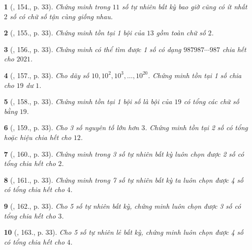 \documentclass{article}
\newtheorem{baitoan}{}
\begin{document}
\begin{baitoan}[\cite{Tuyen_Toan_6}, 154., p. 33]
	Chứng minh trong $11$ số tự nhiên bất kỳ bao giờ cũng có ít nhất $2$ số có chữ số tận cùng giống nhau.
\end{baitoan}

\begin{baitoan}[\cite{Tuyen_Toan_6}, 155., p. 33]
	Chứng minh tồn tại 1 bội của $13$ gồm toàn chữ số $2$.
\end{baitoan}

\begin{baitoan}[\cite{Tuyen_Toan_6}, 156., p. 33]
	Chứng minh có thể tìm được 1 số có dạng $987987\cdots987$ chia hết cho $2021$.
\end{baitoan}

\begin{baitoan}[\cite{Tuyen_Toan_6}, 157., p. 33]
	Cho dãy số $10,10^2,10^3,\ldots,10^{20}$. Chứng minh tồn tại 1 số chia cho $19$ dư $1$.
\end{baitoan}

\begin{baitoan}[\cite{Tuyen_Toan_6}, 158., p. 33]
	Chứng minh tồn tại 1 bội số là bội của $19$ có tổng các chữ số bằng $19$.
\end{baitoan}

\begin{baitoan}[\cite{Tuyen_Toan_6}, 159., p. 33]
	Cho 3 số nguyên tố lớn hơn $3$. Chứng minh tồn tại 2 số có tổng hoặc hiệu chia hết cho $12$.
\end{baitoan}

\begin{baitoan}[\cite{Tuyen_Toan_6}, 160., p. 33]
	Chứng minh trong 3 số tự nhiên bất kỳ luôn chọn được 2 số có tổng chia hết cho $2$.
\end{baitoan}

\begin{baitoan}[\cite{Tuyen_Toan_6}, 161., p. 33]
	Chứng minh trong 7 số tự nhiên bất kỳ ta luôn chọn được 4 số có tổng chia hết cho $4$.
\end{baitoan}

\begin{baitoan}[\cite{Tuyen_Toan_6}, 162., p. 33]
	Cho 5 số tự nhiên bất kỳ, chứng minh luôn chọn được 3 số có tổng chia hết cho $3$.
\end{baitoan}

\begin{baitoan}[\cite{Tuyen_Toan_6}, 163., p. 33]
	Cho 5 số tự nhiên lẻ bất kỳ, chứng minh luôn chọn được 4 số có tổng chia hết cho $4$.
\end{baitoan}
\end{document}
